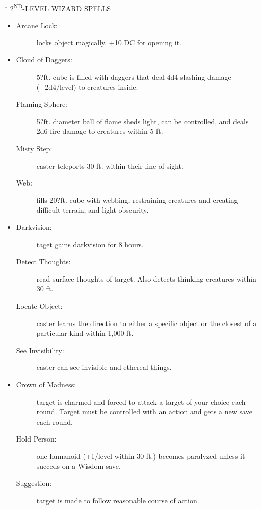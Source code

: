 \documentclass[DIV=14, paper=a4, fontsize=10pt, twocolumn, twoside]{scrartcl}
\makeatletter
\let\origsection\section
\renewcommand\section{\@ifstar{\starsection}{\nostarsection}}
\newcommand\nostarsection[1]
{\origsection{#1}\vspace{-0.5em}}
\newcommand\starsection[1]
{\vspace{-0.5cm}\origsection*{#1}\vspace{-0.3cm}}
\newcommand\invisiblesection[1]{%
  \refstepcounter{section}%
  \sectionmark{#1}
}
\newcommand\listsection[2]{%
	\invisiblesection{#2}
	\section*{\color{dndblue} #1}
}
\renewcommand\thesection{}
\makeatother
\begin{document}
\listsection{\color{dndblue}2\textsuperscript{ND}-LEVEL WIZARD SPELLS}{LEVEL 2}

\begin{itemize}[align=parleft,labelwidth=1cm]
	\renewcommand{\labelitemi}{Abjur}\item
	\begin{description}
 \item[Arcane Lock:] locks object magically. +10 DC for opening it.
\end{description}
\renewcommand{\labelitemi}{Conj}\item
\begin{description}
 \item[Cloud of Daggers:] 5?ft. cube is filled with daggers that deal 4d4 slashing damage (+2d4/level) to creatures inside.
 \item[Flaming Sphere:] 5?ft. diameter ball of flame sheds light, can be controlled, and deals 2d6 fire damage to creatures within 5 ft.
 \item[Misty Step:] caster teleports 30 ft. within their line of sight.
 \item[Web:] fills 20?ft. cube with webbing, restraining creatures and creating difficult terrain, and light obscurity.
\end{description}
\renewcommand{\labelitemi}{Div}\item
\begin{description}
 \item[Darkvision:] taget gains darkvision for 8 hours.
 \item[Detect Thoughts:] read surface thoughts of target. Also detects thinking creatures within 30 ft.
 \item[Locate Object:] caster learns the direction to either a specific object or the closest of a particular kind within 1,000 ft.
 \item[See Invisibility:] caster can see invisible and ethereal things.
\end{description}
\renewcommand{\labelitemi}{Ench}\item
\begin{description}
 \item[Crown of Madness:] target is charmed and forced to attack a target of your choice each round. Target must be controlled with an action and gets a new save each round.
 \item[Hold Person:] one humanoid (+1/level within 30 ft.) becomes paralyzed unless it succeds on a Wisdom save.
 \item[Suggestion:] target is made to follow reasonable course of action.

\end{description}
\end{itemize}
\end{document}
